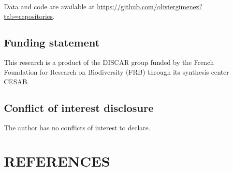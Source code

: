 \documentclass[
  11pt,
  a4paper,
]{article}
\begin{document}
Data and code are available at \href{https://github.com/oliviergimenez?tab=repositories}{https://github.com/oliviergimenez?tab=repositories}.

\subsection{Funding statement}\label{funding-statement}

This research is a product of the DISCAR group funded by the French Foundation for Research on Biodiversity (FRB) through its synthesis center CESAB.

\subsection{Conflict of interest disclosure}\label{conflict-of-interest-disclosure}

The author has no conflicts of interest to declare.

\section{REFERENCES}\label{references}
\end{document}
